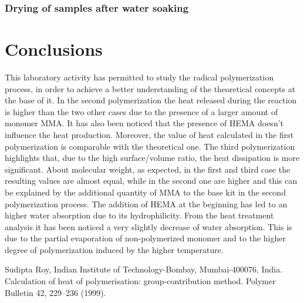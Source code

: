 \documentclass[a4paper, 11pt]{article}
\begin{document}
\subsubsection{Drying of samples after water soaking}


\section{Conclusions}

This laboratory activity has permitted to study the radical polymerization process, in order to achieve a better understanding of the theoretical concepts at the base of it.
In the second polymerization the heat released during the reaction is higher than the two other cases due to the presence of a larger amount of monomer MMA. It has also been noticed that the presence of HEMA doesn't influence the heat production. Moreover, the value of heat calculated in the first polymerization is comparable with the theoretical one. The third polymerization highlights that, due to the high surface/volume ratio, the heat dissipation is more significant. About molecular weight, as expected, in the first and third case the resulting values are almost equal, while in the second one are higher and this can be explained by the additional quantity of MMA to the base kit in the second polymerization process. The addition of HEMA at the beginning has led to an higher water absorption due to its hydrophilicity. From the heat treatment analysis it has been noticed a very slightly decrease of water absorption. This is due to the partial evaporation of non-polymerized monomer and to the higher degree of polymerization induced by the higher temperature.


\newpage
\thispagestyle{empty}


\begin{thebibliography}{11}

 Sudipta Roy, Indian Institute of Technology-Bombay, Mumbai-400076, India. Calculation of heat of polymerisation: group-contribution method. Polymer Bulletin 42, 229–236 (1999).

\end{thebibliography}
\end{document}
